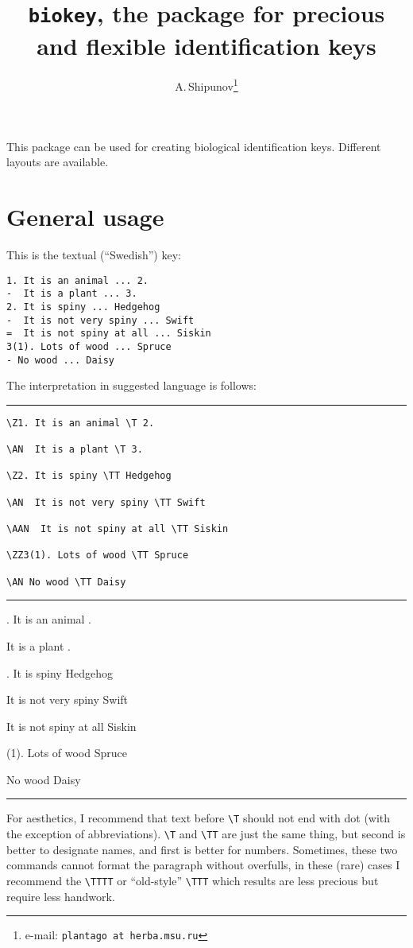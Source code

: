\documentclass{article}
\author{A.\,Shipunov\footnote{e-mail: \texttt{plantago at herba.msu.ru}}}
\title{\texttt{biokey}, the package for precious and flexible identification keys}
\date{}
\begin{document}
\maketitle

This package can be used for creating biological identification keys. Different layouts are available.

\section{General usage}

This is the textual (``Swedish'') key:
                           
\begin{verbatim}
1. It is an animal ... 2.
-  It is a plant ... 3.
2. It is spiny ... Hedgehog
-  It is not very spiny ... Swift
=  It is not spiny at all ... Siskin
3(1). Lots of wood ... Spruce
- No wood ... Daisy
\end{verbatim}

The interpretation in suggested language is follows:

\bigskip\hrule

\begin{verbatim}
\Z1. It is an animal \T 2.

\AN  It is a plant \T 3.

\Z2. It is spiny \TT Hedgehog

\AN  It is not very spiny \TT Swift

\AAN  It is not spiny at all \TT Siskin

\ZZ3(1). Lots of wood \TT Spruce

\AN No wood \TT Daisy
\end{verbatim}

\hrule\bigskip

. It is an animal .

\AN  It is a plant .

. It is spiny \TT Hedgehog

\AN  It is not very spiny \TT Swift

\AAN  It is not spiny at all \TT Siskin

(1). Lots of wood \TT Spruce

\AN No wood \TT Daisy

\bigskip\hrule\bigskip

For aesthetics, I recommend that text before \verb|\T| should not end with dot (with the exception of abbreviations). \verb|\T| and \verb|\TT| are just the same thing, but second is better to designate names, and first is better for numbers. Sometimes, these two commands cannot format the paragraph without overfulls, in these (rare) cases I recommend the \verb|\TTTT| or ``old-style'' \verb|\TTT| which results are less precious but require less handwork.
\end{document}
